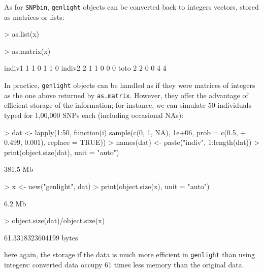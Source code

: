 \documentclass{article}
\begin{document}
As for \texttt{SNPbin}, \texttt{genlight} objects can be converted back to integers vectors, stored
as matrices or lists:
\begin{Schunk}
\begin{Sinput}
> as.list(x)
\end{Sinput}
\begin{Sinput}
> as.matrix(x)
\end{Sinput}
\begin{Soutput}
       [,1] [,2] [,3] [,4] [,5] [,6]
indiv1    1    1    0    1    1    0
indiv2    2    1    1    0    0    0
toto      2    2    0    0    4    4
\end{Soutput}
\end{Schunk}

\noindent In practice, \texttt{genlight} objects can be handled as if they were matrices of integers
as the one above returned by \texttt{as.matrix}.
However, they offer the advantage of efficient storage of the information; for instance, we can
simulate 50 individuals typed for 1,00,000 SNPs each (including occasional NAs):
\begin{Schunk}
\begin{Sinput}
> dat <- lapply(1:50, function(i) sample(c(0, 1, NA), 1e+06, prob = c(0.5, 
+     0.499, 0.001), replace = TRUE))
> names(dat) <- paste("indiv", 1:length(dat))
> print(object.size(dat), unit = "auto")
\end{Sinput}
\begin{Soutput}
381.5 Mb
\end{Soutput}
\begin{Sinput}
> x <- new("genlight", dat)
> print(object.size(x), unit = "auto")
\end{Sinput}
\begin{Soutput}
6.2 Mb
\end{Soutput}
\begin{Sinput}
> object.size(dat)/object.size(x)
\end{Sinput}
\begin{Soutput}
61.3318323604199 bytes
\end{Soutput}
\end{Schunk}
here again, the storage if the data is much more efficient in \texttt{genlight} than using integers: converted data occupy
61 times less memory than the original data.
\\
\end{document}
